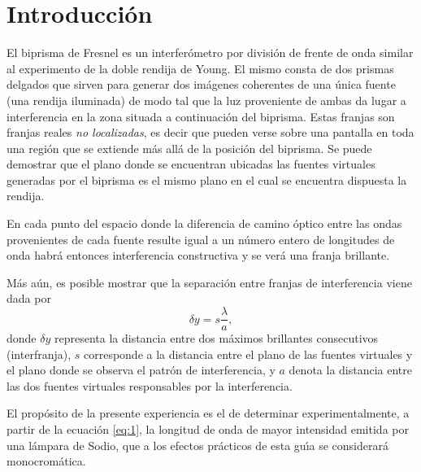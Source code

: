 \documentclass[laboratorio]{guia}
\begin{document}
\maketitle

\section{Introducci\'on}

El biprisma de Fresnel es un interfer\'ometro por divisi\'on de frente de onda
similar al experimento de la doble rendija de Young. El mismo consta de dos
prismas delgados que sirven para generar dos im\'agenes coherentes de una
\'unica fuente (una rendija iluminada) de modo tal que la luz proveniente de
ambas da lugar a interferencia en la zona situada a continuaci\'on del
biprisma. Estas franjas son franjas reales {\it no localizadas}, es decir que
pueden verse sobre una pantalla en toda una regi\'on que se extiende m\'as
all\'a de la posici\'on del biprisma. Se puede demostrar que el plano donde se
encuentran ubicadas las fuentes virtuales generadas por el biprisma es el mismo
plano en el cual se encuentra dispuesta la rendija. 

En cada punto del espacio donde la diferencia de camino \'optico entre las
ondas provenientes de cada fuente resulte igual a un n\'umero entero de
longitudes de onda habr\'a entonces interferencia constructiva y se ver\'a una
franja brillante. 

M\'as a\'un, es posible mostrar que la separaci\'on entre franjas de interferencia
viene dada por
\begin{equation}
    \delta y = s \frac{\lambda}{a},
    \label{eq:1}
\end{equation}
donde $\delta y$ representa la distancia entre dos m\'aximos brillantes
consecutivos (interfranja), $s$ corresponde a la distancia entre el plano de
las fuentes virtuales y el plano donde se observa el patr\'on de interferencia,
y $a$ denota la distancia entre las dos fuentes virtuales responsables por la
interferencia.

El prop\'osito de la presente experiencia es el de determinar
experimentalmente, a partir de la ecuaci\'on \eqref{eq:1}, la longitud de onda
de mayor intensidad emitida por una l\'ampara de Sodio, que a los efectos
pr\'acticos de esta gu\'\i a se considerar\'a monocrom\'atica.
\end{document}
